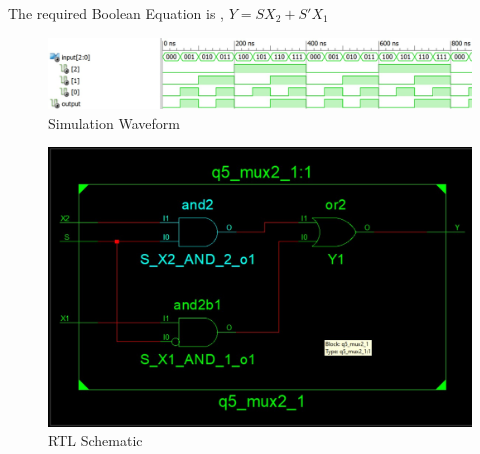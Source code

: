 \documentclass{article}
\begin{document}
The required Boolean Equation is , $Y=SX_2 + S'X_1$

\HRule
{}
\HRule

\HRule
{}
\HRule


\HRule
{}
\HRule



\begin{figure}[H]
    \centering
    \includegraphics[scale=0.55,cframe=blue 0.5pt 3pt]{5w.jpg}
    \caption{Simulation Waveform  }
\end{figure}


\begin{figure}[H]
    \centering
    \includegraphics[scale=0.72,cframe=blue 0.5pt 3pt]{5s.jpg}
    \caption{RTL Schematic  }
\end{figure}






\end{document}
